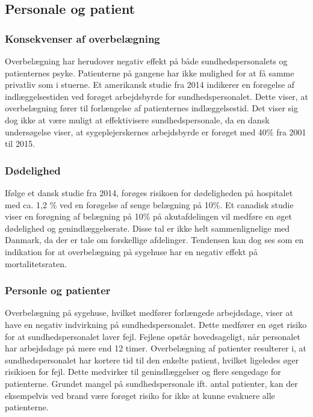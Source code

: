 \subsection{Personale og patient}

\subsubsection{Konsekvenser af overbelægning}


Overbelægning har herudover negativ effekt på både sundhedspersonalets og patienternes psyke. Patienterne på gangene har ikke mulighed for at få samme privatliv som i stuerne.\citep{Madsen2014}  Et amerikansk studie fra 2014 indikerer en forøgelse af indlæggelsestiden ved forøget arbejdsbyrde for sundhedspersonalet\citep{Elliott2014}. Dette viser, at overbelægning fører til forlængelse af patienternes indlæggelsestid. Det viser sig dog ikke at være muligt at effektivisere sundhedspersonale, da en dansk undersøgelse viser, at sygeplejerskernes arbejdsbyrde er forøget med 40\% fra 2001 til 2015.\citep{Kjeldsen2015}

\subsubsection{Dødelighed}
 Ifølge et dansk studie fra 2014, forøges risikoen for dødeligheden på hospitalet med ca. 1,2 \% ved en forøgelse af senge belægning på 10\%. \citep{Madsen2014} Et canadisk studie viser en forøgning af belægning på 10\% på akutafdelingen vil medføre en øget dødelighed og genindlæggelserate.\citep{McCusker2014} Disse tal er ikke helt sammenlignelige med Danmark, da der er tale om forskellige afdelinger. Tendensen kan dog ses som en indikation for at overbelægning på sygehuse har en negativ effekt på mortalitetsraten.


\subsubsection{Personle og patienter}
Overbelægning på sygehuse, hvilket medfører forlængede arbejdsdage, viser at have en negativ indvirkning på sundhedspersonalet. \citep{Kjeldsen2015} Dette medfører en øget risiko for at sundhedspersonalet laver fejl. Fejlene opstår hovedsageligt, når personalet har arbejdsdage på mere end 12 timer. \citep{Dinges2004} Overbelægning af patienter resulterer i, at sundhedspersonalet har kortere tid til den enkelte patient, hvilket ligeledes øger risikioen for fejl. Dette medvirker til genindlæggelser og flere sengedage for patienterne. Grundet mangel på sundhedspersonale ift. antal patienter, kan der eksempelvis ved brand være forøget risiko for ikke at kunne evakuere alle patienterne. \citep{Madsen2014}